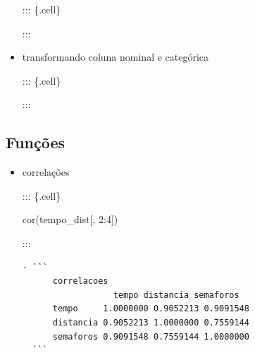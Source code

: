 \documentclass[
  letterpaper,
  DIV=11,
  numbers=noendperiod]{scrreprt}
\newenvironment{Shaded}{\begin{snugshade}}{\end{snugshade}}
\newcommand{\AttributeTok}[1]{\textcolor[rgb]{0.40,0.45,0.13}{#1}}
\newcommand{\DecValTok}[1]{\textcolor[rgb]{0.68,0.00,0.00}{#1}}
\newcommand{\FunctionTok}[1]{\textcolor[rgb]{0.28,0.35,0.67}{#1}}
\newcommand{\NormalTok}[1]{\textcolor[rgb]{0.00,0.23,0.31}{#1}}
\newcommand{\OtherTok}[1]{\textcolor[rgb]{0.00,0.23,0.31}{#1}}
\newcommand{\SpecialCharTok}[1]{\textcolor[rgb]{0.37,0.37,0.37}{#1}}
\newcommand{\StringTok}[1]{\textcolor[rgb]{0.13,0.47,0.30}{#1}}
\begin{document}
\begin{itemize}
  ::: \{.cell\}

\begin{Shaded}
\end{Shaded}

  :::
\item
  transformando coluna nominal e categórica

  ::: \{.cell\}

\begin{Shaded}
\end{Shaded}

  :::
\end{itemize}

\hypertarget{funuxe7uxf5es}{%
\subsection{Funções}\label{funuxe7uxf5es}}

\begin{itemize}
\item
  correlações

  ::: \{.cell\}

\begin{Shaded}
\begin{Highlighting}[]
\FunctionTok{cor}\NormalTok{(tempo\_dist[, }\DecValTok{2}\SpecialCharTok{:}\DecValTok{4}\NormalTok{])}
\end{Highlighting}
\end{Shaded}

  :::

\begin{verbatim}
- ```
      correlacoes
                  tempo distancia semaforos
      tempo     1.0000000 0.9052213 0.9091548
      distancia 0.9052213 1.0000000 0.7559144
      semaforos 0.9091548 0.7559144 1.0000000  
  ```
\end{verbatim}
\end{itemize}
\end{document}
